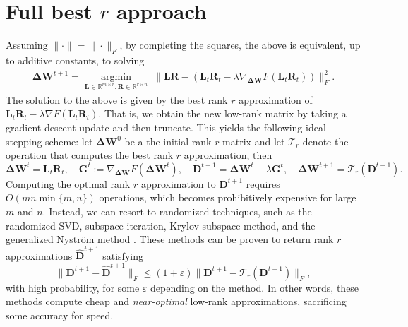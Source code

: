 \documentclass[11pt]{article}
\newcommand{\mat}[1]{\bm{#1}}
\newcommand{\R}{\mathbb{R}}
\newcommand{\mD}{\mat{D}}
\newcommand{\mG}{\mat{G}}
\newcommand{\mL}{\mat{L}}
\newcommand{\mR}{\mat{R}}
\newcommand{\DW}{\mat{\Delta W}}
\DeclareMathOperator{\argmininn}{argmin}
\newcommand{\argmin}[1]{ \underset{#1}{\argmininn} \;}
\begin{document}
\section{Full best $r$ approach}
Assuming $\|\cdot\| = \|\cdot\|_F$, by completing the squares, the above is equivalent, up to additive constants, to solving
\begin{align}
 \DW^{t+1}=   \argmin{\mL\in \R^{m \times r},\mR \in \R^{r \times n}} \| \mL\mR - (  \mL_t\mR_t -\lambda \nabla_{\DW} F(\mL_t\mR_t)) \|_F^2. \label{eq:fullprodGD-square}
\end{align}
The solution to the above is given by the best rank $r$ approximation of $\mL_t\mR_t - \lambda \nabla F(\mL_t \mR_t)$. That is, we obtain the new low-rank matrix by taking a gradient descent update and then truncate. This yields the following ideal stepping scheme: let $\DW^0$ be a the initial rank $r$ matrix and let $\mathcal{T}_r$ denote the operation that computes the best rank $r$ approximation, then
\begin{equation}\label{eq:update_scheme}
    \DW^t = \mL_t \mR_t, \quad \mG^t := \nabla_{\DW} F(\DW^t), \quad \mD^{t+1} = \DW^t - \lambda \mG^t, \quad \DW^{t+1} = \mathcal{T}_r\left(\mD^{t+1}\right). 
\end{equation}
Computing the optimal rank $r$ approximation to $\mD^{t+1}$ requires $O(mn\min\{m,n\})$ operations, which becomes prohibitively expensive for large $m$ and $n$. Instead, we can resort to randomized techniques, such as the randomized SVD, subspace iteration, Krylov subspace method, and the generalized Nyström method \cite{rsvd, MM15, tropp2023randomized, nakatsukasa2020fast}. These methods can be proven to return rank $r$ approximations $\widehat{\bm{D}}^{t+1}$ satisfying
\begin{equation*}
    \|\bm{D}^{t+1}-\widehat{\bm{D}}^{t+1}\|_F \leq (1+\varepsilon) \|\bm{D}^{t+1}-\mathcal{T}_r(\bm{D}^{t+1})\|_F,
\end{equation*}
with high probability, for some $\varepsilon$ depending on the method. In other words, these methods compute cheap and \emph{near-optimal} low-rank approximations, sacrificing  some accuracy for speed. 
\end{document}
